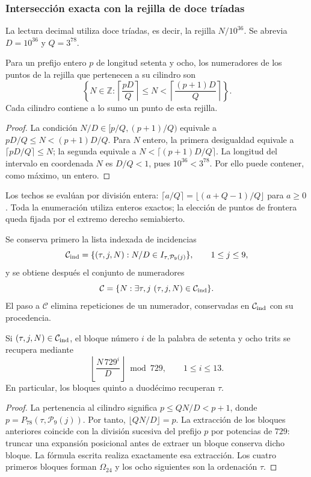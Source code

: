 \subsubsection{Intersección exacta con la rejilla de doce tríadas}

La lectura decimal utiliza doce tríadas, es decir, la rejilla
$N/10^{36}$. Se abrevia $D=10^{36}$ y $Q=3^{78}$.

\begin{lemma}
Para un prefijo entero $p$ de longitud setenta y ocho, los numeradores
de los puntos de la rejilla que pertenecen a su cilindro son
\begin{equation}
 \left\{N\in\mathbb Z:
 \left\lceil\frac{pD}{Q}\right\rceil
 \leq N<
 \left\lceil\frac{(p+1)D}{Q}\right\rceil\right\}.
 \label{eq:kdes-rejilla}
\end{equation}
Cada cilindro contiene a lo sumo un punto de esta rejilla.
\end{lemma}
\begin{proof}
La condición $N/D\in[p/Q,(p+1)/Q)$ equivale a
$pD/Q\leq N<(p+1)D/Q$. Para $N$ entero, la primera desigualdad
equivale a $\lceil pD/Q\rceil\leq N$; la segunda equivale a
$N<\lceil(p+1)D/Q\rceil$. La longitud del intervalo en coordenada
$N$ es $D/Q<1$, pues $10^{36}<3^{78}$. Por ello puede contener,
como máximo, un entero.
\end{proof}

Los techos se evalúan por división entera:
$\lceil a/Q\rceil=\lfloor(a+Q-1)/Q\rfloor$ para $a\geq0$.
Toda la enumeración utiliza enteros exactos; la elección de puntos de
frontera queda fijada por el extremo derecho semiabierto.

Se conserva primero la lista indexada de incidencias
\[
 \mathcal C_{\rm ind}=
 \{(\tau,j,N):N/D\in I_{\tau,\mathcal P_9(j)}\},
 \qquad1\leq j\leq9,
\]
y se obtiene después el conjunto de numeradores
\[
 \mathcal C=\{N:\exists\tau,j\ (\tau,j,N)\in\mathcal C_{\rm ind}\}.
\]
El paso a $\mathcal C$ elimina repeticiones de un numerador, conservadas
en $\mathcal C_{\rm ind}$ con su procedencia.

\begin{lemma}
Si $(\tau,j,N)\in\mathcal C_{\rm ind}$, el bloque número $i$ de la
palabra de setenta y ocho trits se recupera mediante
\[
 \left\lfloor\frac{N\,729^i}{D}\right\rfloor\bmod729,
 \qquad1\leq i\leq13.
\]
En particular, los bloques quinto a duodécimo recuperan $\tau$.
\end{lemma}
\begin{proof}
La pertenencia al cilindro significa
$p\leq QN/D<p+1$, donde $p=P_{78}(\tau,\mathcal P_9(j))$.
Por tanto, $\lfloor QN/D\rfloor=p$. La extracción de los bloques
anteriores coincide con la división sucesiva del prefijo $p$ por
potencias de $729$: truncar una expansión posicional antes de extraer
un bloque conserva dicho bloque. La fórmula escrita realiza
exactamente esa extracción. Los cuatro primeros bloques forman
$\Omega_{24}$ y los ocho siguientes son la ordenación $\tau$.
\end{proof}

